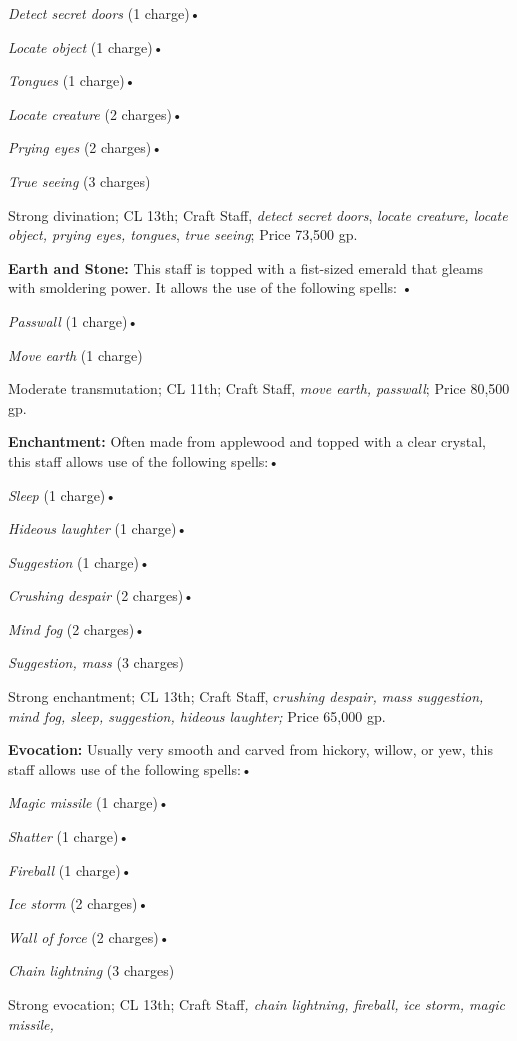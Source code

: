 \textit{Detect secret doors }(1 charge)•

\textit{Locate object }(1 charge)•

\textit{Tongues }(1 charge)•

\textit{Locate creature }(2 charges)•

\textit{Prying eyes }(2 charges)•

\textit{True seeing }(3 charges)

Strong divination; CL 13th; Craft Staff, \textit{detect secret doors}, \textit{locate 
creature, locate object, prying eyes, tongues}, \textit{true seeing}; Price 73,500 
gp.

\textbf{Earth and Stone:} This staff is topped with a fist-sized emerald that gleams 
with smoldering power. It allows the use of the following spells: •

\textit{Passwall }(1 charge)•

\textit{Move earth }(1 charge)

Moderate transmutation; CL 11th; Craft Staff, \textit{move earth, passwall}; Price 
80,500 gp.

\textbf{Enchantment:} Often made from applewood and topped with a clear crystal, 
this staff allows use of the following spells:•

\textit{Sleep }(1 charge)•

\textit{Hideous laughter }(1 charge)•

\textit{Suggestion }(1 charge)•

\textit{Crushing despair }(2 charges)•

\textit{Mind fog }(2 charges)•

\textit{Suggestion, mass }(3 charges)

Strong enchantment; CL 13th; Craft Staff, c\textit{rushing despair, mass suggestion, 
mind fog, sleep, suggestion, hideous laughter; }Price 65,000 gp.

\textbf{Evocation: }Usually very smooth and carved from hickory, willow, or yew, 
this staff allows use of the following spells:•

\textit{Magic missile }(1 charge)•

\textit{Shatter }(1 charge)•

\textit{Fireball }(1 charge)•

\textit{Ice storm }(2 charges)•

\textit{Wall of force }(2 charges)•

\textit{Chain lightning }(3 charges)

Strong evocation; CL 13th; Craft Staff\textit{, chain lightning, fireball, ice 
storm, magic missile,}


